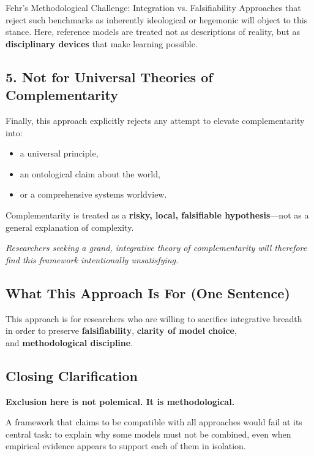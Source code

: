 \begin{chapter}{Fehr's Methodological Challenge: Integration vs. Falsifiability}
Approaches that reject such benchmarks as inherently ideological or hegemonic will object to this stance.
Here, reference models are treated not as descriptions of reality, but as \textbf{disciplinary devices} that make learning possible.

\subsection{5. Not for Universal Theories of Complementarity}

Finally, this approach explicitly rejects any attempt to elevate complementarity into:
\begin{itemize}[noitemsep]
    \item a universal principle,
    \item an ontological claim about the world,
    \item or a comprehensive systems worldview.
\end{itemize}

Complementarity is treated as a \textbf{risky, local, falsifiable hypothesis}---not as a general explanation of complexity.

\textit{Researchers seeking a grand, integrative theory of complementarity will therefore find this framework intentionally unsatisfying.}

\subsection{What This Approach Is For (One Sentence)}

\begin{tcolorbox}[colback=green!5!white,colframe=green!75!black]
\begin{center}
\large
This approach is for researchers who are willing to sacrifice integrative breadth\\
in order to preserve \textbf{falsifiability}, \textbf{clarity of model choice},\\
and \textbf{methodological discipline}.
\end{center}
\end{tcolorbox}

\subsection{Closing Clarification}

\textbf{Exclusion here is not polemical. It is methodological.}

A framework that claims to be compatible with all approaches would fail at its central task:
to explain why some models must not be combined, even when empirical evidence appears to support each of them in isolation.


\end{chapter}
